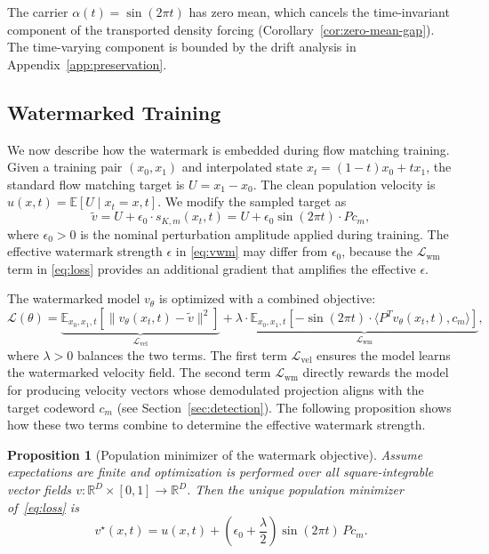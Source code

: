\documentclass[11pt]{article}
\newtheorem{proposition}{Proposition}
\begin{document}
The carrier $\alpha(t)=\sin(2\pi t)$ has zero mean, which cancels the
time-invariant component of the transported density forcing
(Corollary~\ref{cor:zero-mean-gap}). The time-varying component is
bounded by the drift analysis in Appendix~\ref{app:preservation}.

\subsection{Watermarked Training}

We now describe how the watermark is embedded during flow matching
training. Given a training pair $(x_0, x_1)$ and interpolated state
$x_t = (1-t)x_0 + t x_1$, the standard flow matching target is
$U=x_1-x_0$. The clean population velocity is
$u(x,t)=\mathbb E[U\mid x_t=x,t]$. We modify the sampled target as
\begin{equation}
\tilde{v} = U + \epsilon_0 \cdot s_{K,m}(x_t, t)
= U + \epsilon_0 \sin(2\pi t) \cdot P c_m,
\end{equation}
where $\epsilon_0 > 0$ is the nominal perturbation amplitude applied
during training. The effective watermark strength $\epsilon$ in \eqref{eq:vwm} may differ from $\epsilon_0$,
because the $\mathcal{L}_{\text{wm}}$ term in \eqref{eq:loss} provides an additional
gradient that amplifies the effective
$\epsilon$.

The watermarked model $v_\theta$ is optimized with a combined objective:
\begin{equation}\label{eq:loss}
\mathcal{L}(\theta) = \underbrace{\mathbb{E}_{x_0,x_1,t}\left[\|v_\theta(x_t,t)
- \tilde{v}\|^2\right]}_{\mathcal{L}_{\text{vel}}}
+ \lambda \cdot \underbrace{\mathbb{E}_{x_0,x_1,t}\left[-\sin(2\pi t) \cdot
\langle P^T v_\theta(x_t,t), c_m \rangle\right]}_{\mathcal{L}_{\text{wm}}},
\end{equation}
where $\lambda > 0$ balances the two terms. The first term
$\mathcal{L}_{\text{vel}}$ ensures the model learns the watermarked
velocity field. The second term $\mathcal{L}_{\text{wm}}$ directly rewards the model for producing velocity vectors whose demodulated projection aligns with the
target codeword $c_m$ (see Section~\ref{sec:detection}). The following proposition shows how these two terms combine to
determine the effective watermark strength.

\begin{proposition}[Population minimizer of the watermark objective]
\label{prop:optimal_predictor}
Assume expectations are finite and optimization is performed over all
square-integrable vector fields
$v:\mathbb{R}^D\times[0,1]\to\mathbb{R}^D$.
Then the unique population minimizer of~\eqref{eq:loss} is
\begin{equation}
v^\star(x,t)
=
u(x,t)
+
\left(\epsilon_0+\frac{\lambda}{2}\right)
\sin(2\pi t)\,Pc_m.
\end{equation}
\end{proposition}
\end{document}
